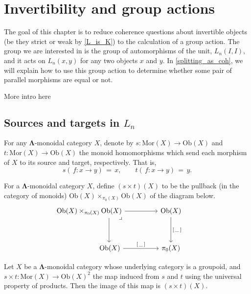 \documentclass{amsbook} %
\newcommand{\ML}{\mathbf{\Lambda}}
\numberwithin{section}{chapter}
\begin{document}
\chapter{Invertibility and group actions}
The goal of this chapter is to reduce coherence questions about invertible objects (be they strict or weak by \cref{L_is_K}) to the calculation of a group action. The group we are interested in is the group of automorphisms of the unit, $L_n(I,I)$, and it acts on $L_n(x,y)$ for any two objects $x$ and $y$. In \cref{splitting_as_coh}, we will explain how to use this group action to determine whether some pair of parallel morphisms are equal or not.

More intro here

\section{Sources and targets in \texorpdfstring{$L_n$}{L_n}}   

\begin{Defi}\label{st} For any $\ML$-monoidal category $X$, denote by $s: \mathrm{Mor}(X) \to \mathrm{Ob}(X)$ and $t: \mathrm{Mor}(X) \to \mathrm{Ob}(X)$ the monoid homomorphisms which send each morphism of $X$ to its source and target, respectively. That is,
\[ s( \, f: x \to y) \, = \, x, \quad \quad t( \, f: x \to y) \, = \, y. \]
\end{Defi}

\begin{Defi}\label{s_times_t}
For a $\ML$-monoidal category $X$, define $(s \times t)(X)$ to be the pullback (in the category of monoids) $\mathrm{Ob}(X) \times_{\pi_0(X)} \mathrm{Ob}(X)$ of the diagram below. 
\[ \begin{tikzcd}
\mathrm{Ob}(X) \times_{\pi_0(X)} \mathrm{Ob}(X) \ar[dd, shift left=12] \ar[rr] \ar[ddrr, phantom, "\lrcorner", near start, shift left=4] & & \mathrm{Ob}(X) \ar[dd, "\lbrack \, \_ \, \rbrack"] & \\ 
& & & \\
\quad \quad \quad \quad \quad \quad \mathrm{Ob}(X) \ar[rr, "\lbrack \, \_ \, \rbrack"] & & \pi_0(X)
\end{tikzcd} \]
\end{Defi}

\begin{lem}\label{stmon} Let $X$ be a $\ML$-monoidal category whose underlying category is a groupoid, and $s \times t: \mathrm{Mor}(X) \to \mathrm{Ob}(X)^2$ the map induced from $s$ and $t$ using the universal property of products. Then the image of this map is $(s \times t)(X)$.
\end{lem} 
\end{document}
